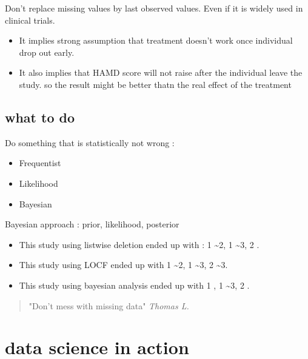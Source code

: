 \documentclass{beamer}
\begin{document}
\begin{frame}
Don't replace missing values by last observed values. Even if it is widely used in clinical trials.
	\begin{itemize}
\item It implies strong assumption that treatment doesn't work once individual drop out early. 
\item It also implies that HAMD score will not raise after the individual leave the study. so the result might be better thatn the real effect of the treatment
	\end{itemize}
\end{frame}

\subsection{what to do}
\begin{frame}
	\Large Do something that is statistically not wrong :
	\begin{itemize}
		\item Frequentist
		\item Likelihood 
		\item Bayesian 
        \end{itemize}
        Bayesian approach : prior, likelihood, posterior
\end{frame}

\begin{frame}
	\begin{itemize}
		\item This study using listwise deletion ended up with : 1 \sim 2, 1 \sim 3, 2 .
		\item This study using LOCF ended up with 1 \sim 2, 1 \sim 3, 2 \sim 3.
        	\item This study using bayesian analysis ended up with 1 , 1 \sim 3, 2 .
	\end{itemize}
        \begin{quote}
		"Don't mess with missing data" \textit{Thomas L.}
	\end{quote}
\end{frame}

\section{data science in action}
\end{document}
